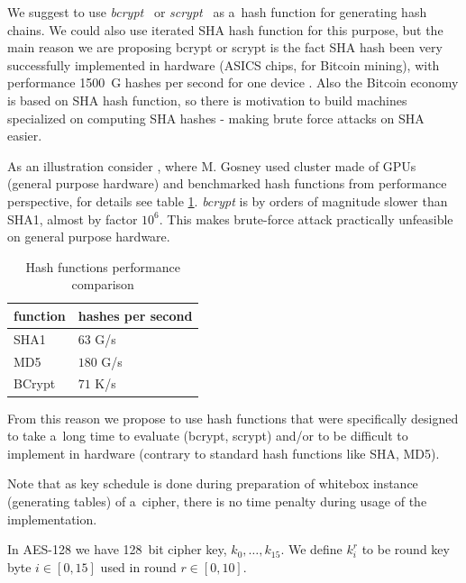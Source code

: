 \documentclass[11pt,oneside,final]{fithesis2}
\begin{document}
    We suggest to use \emph{bcrypt}~\citep{Provos99afuture-adaptable} or \emph{scrypt}~\citep{Percival_strongerkey} as a~hash function for generating hash chains. 
    We could also use iterated SHA hash function for this purpose, but the main reason we are proposing bcrypt or scrypt is the fact SHA hash been
    very successfully implemented in hardware (ASICS chips, for Bitcoin mining), with performance 1500~G hashes per second for one device \cite{shamining_web}.
    Also the Bitcoin economy is based on SHA hash function, so there is motivation to build machines specialized on computing SHA hashes - making
    brute force attacks on SHA easier.

    As an illustration consider \cite{bcrypthash}, where M. Gosney used cluster made of GPUs (general purpose hardware) and benchmarked hash functions from performance perspective, for
    details see table \ref{tbl:hash_performance}. \emph{bcrypt} is by orders of magnitude slower than SHA1, almost by factor $10^6$. This makes brute-force
    attack practically unfeasible on general purpose hardware. 

    \begin{table}
    \begin{center}
    \begin{tabular}{ | l | l | }
 	\hline    
	function & hashes per second \\ \hline
	SHA1     & $63$ G/s \\ \hline
	MD5      & $180$ G/s \\ \hline
	BCrypt   & $71$ K/s \\   \hline
    \end{tabular}
    \caption{Hash functions performance comparison}
    \label{tbl:hash_performance}
    \end{center} 
    \end{table}

    From this reason we propose to use hash functions that were specifically designed to take a~long time to evaluate (bcrypt, scrypt) 
    and/or to be difficult to implement in hardware (contrary to standard hash functions like SHA, MD5).

    Note that as key schedule is done during preparation of whitebox instance (generating tables) of a~cipher, there is no time penalty during 
    usage of the implementation.
        
    In AES-128 we have 128~bit cipher key, $k_0,\dots,k_{15}$. We define $k_i^r$ to be round key byte $i \in [0,15]$ used in round $r \in [0,10]$.
    
\end{document}
